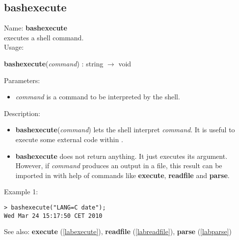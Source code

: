 \subsection{bashexecute}
\label{labbashexecute}
\noindent Name: \textbf{bashexecute}\\
executes a shell command.\\
\noindent Usage: 
\begin{center}
\textbf{bashexecute}(\emph{command}) : \textsf{string} $\rightarrow$ \textsf{void}\\
\end{center}
Parameters: 
\begin{itemize}
\item \emph{command} is a command to be interpreted by the shell.
\end{itemize}
\noindent Description: \begin{itemize}

\item \textbf{bashexecute}(\emph{command}) lets the shell interpret \emph{command}. It is useful to execute
   some external code within \sollya.

\item \textbf{bashexecute} does not return anything. It just executes its argument. However, if
   \emph{command} produces an output in a file, this result can be imported in \sollya
   with help of commands like \textbf{execute}, \textbf{readfile} and \textbf{parse}.
\end{itemize}
\noindent Example 1: 
\begin{center}\begin{minipage}{15cm}\begin{Verbatim}[frame=single]
> bashexecute("LANG=C date");
Wed Mar 24 15:17:50 CET 2010
\end{Verbatim}
\end{minipage}\end{center}
See also: \textbf{execute} (\ref{labexecute}), \textbf{readfile} (\ref{labreadfile}), \textbf{parse} (\ref{labparse})
